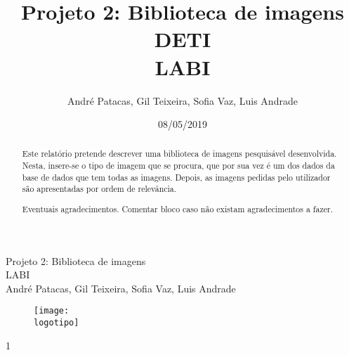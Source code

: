 \documentclass{report}
\begin{document}
%
\def\titulo{Projeto 2: Biblioteca de imagens}
\def\data{08/05/2019}
\def\autores{André Patacas, Gil Teixeira, Sofia Vaz, Luis Andrade}
\def\autorescontactos{(93357) andrepatacas@ua.pt, (88194) gilteixeira@ua.pt, (92968) sofiateixeiravaz@ua.pt, (93159) luisnunoferreirap.a@ua.pt}
\def\versao{1}
\def\departamento{DETI}
\def\empresa{LABI}
\def\logotipo{ua.pdf}
%
%
\begin{titlepage}

\begin{center}
\centering
%
\vspace*{50mm}
%
{\Huge \titulo}\\ 
%
\vspace{10mm}
%
{\Large \empresa}\\
%
\vspace{10mm}
%
{\large \autores}\\ 
%
\vspace{30mm}
%
\begin{figure}[h]
\centering
\texttt{[image: \\logotipo]}
\end{figure}
%
\vspace{30mm}
\end{center}
%
\begin{flushright}
\versao
\end{flushright}
\end{titlepage}

\title{%
{\Huge\textbf{\titulo}}\\
{\Large \departamento\\ \empresa}
}
%
\author{%
    \autores 
}
%
\date{\data}
%
\maketitle



\begin{abstract}
Este relatório pretende descrever uma biblioteca de imagens pesquisável desenvolvida. 
Nesta, insere-se o tipo de imagem que se procura, que por sua vez é um dos dados da base de dados que tem todas as imagens. Depois, as imagens pedidas pelo utilizador são apresentadas por ordem de relevância.
\end{abstract}

\renewcommand{\abstractname}{Agradecimentos}
\begin{abstract}
Eventuais agradecimentos.
Comentar bloco caso não existam agradecimentos a fazer.
\end{abstract}
\end{document}
